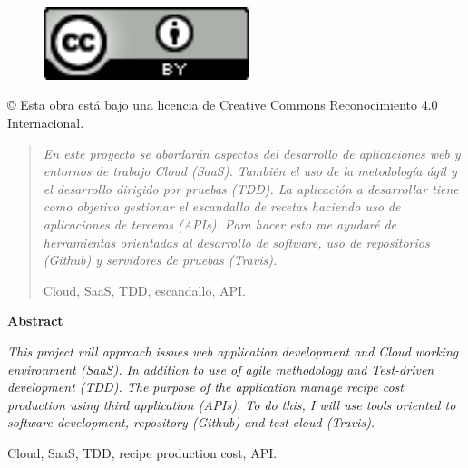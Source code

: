 \documentclass[spanish,a4paper,14pt,twoside]{report}
\newenvironment{summary}
{\par\noindent\begin{center}\textbf{Abstract}\end{center}\begin{itshape}\par\noindent}
{\end{itshape}}
\newenvironment{keywords}
{\begin{list}{}{\setlength{\leftmargin}{1em}}\item[\hskip\labelsep \bfseries Keywords:]}
{\end{list}}
\newenvironment{palabrasClave}
{\begin{list}{}{\setlength{\leftmargin}{1em}}\item[\hskip\labelsep \bfseries Palabras clave:]}
{\end{list}}
\begin{document}
\newpage
{
\begin{center}
  \begin{figure}[htb]
    \begin{center}
      \includegraphics[width=6cm]{./images/logotipo-licencia.png}
    \end{center}
  \end{figure}
  
  \vspace*{0.2in}
  \begin{Large}
    © Esta obra está bajo una licencia de Creative Commons Reconocimiento 4.0 Internacional.
  \end{Large}
\end{center}
}


\cleardoublepage
\begin{abstract}
{\em 
En este proyecto se abordarán aspectos del desarrollo de aplicaciones web y entornos de trabajo Cloud (SaaS). También el uso de la metodología ágil y el desarrollo dirigido por pruebas (TDD). La aplicación a desarrollar tiene como objetivo gestionar el escandallo de recetas haciendo uso de aplicaciones de terceros (APIs). Para hacer esto me ayudaré de herramientas orientadas al desarrollo de software, uso de repositorios (Github) y servidores de pruebas (Travis).
}

\vspace*{0.2in}
\begin{palabrasClave}
  Cloud, SaaS, TDD, escandallo, API.
\end{palabrasClave}

\end{abstract}

\cleardoublepage
\begin{summary}
{\em 
This project will approach issues web application development and Cloud working environment (SaaS). In addition to use of agile methodology and Test-driven development (TDD). The purpose of the application manage recipe cost production using third application (APIs). To do this, I will use tools oriented to software development, repository (Github) and test cloud (Travis).
}

\vspace*{0.2in}
\begin{keywords}
  Cloud, SaaS, TDD, recipe production cost, API.
\end{keywords}

\end{summary}
\end{document}
